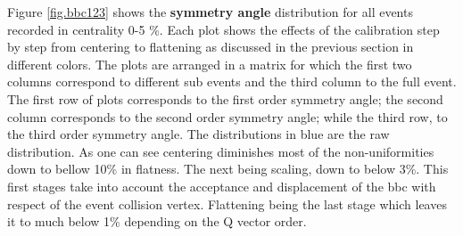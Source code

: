 \documentclass{article}
\begin{document}
Figure \ref{fig.bbc123} shows the {\bf symmetry angle} distribution for all events recorded in centrality 0-5 \%.
Each plot shows the effects of the calibration step by step from centering to flattening as discussed in the previous section in different colors.
The plots are arranged in a matrix for which the first two columns correspond to different sub events and the third column to the full event.
The first row of plots corresponds to the first order symmetry angle; the second column corresponds to the second order symmetry angle; while the third row, to the third order symmetry angle.
The distributions in blue are the raw distribution. As one can see centering diminishes most of the non-uniformities down to bellow 10\% in flatness. The next being scaling, down to below 3\%. This first stages take into account the acceptance and displacement of the bbc with respect of the event collision vertex.
Flattening being the last stage which leaves it to much below 1\% depending on the Q vector order.
\end{document}
